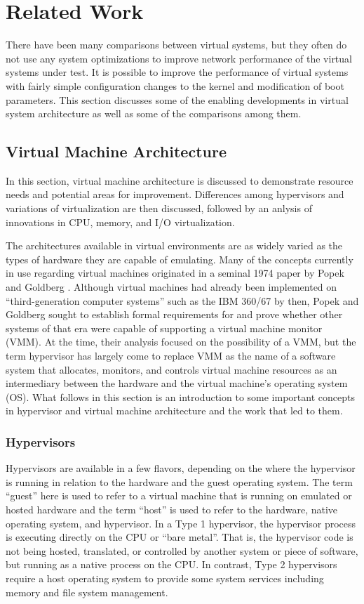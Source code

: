 \chapter{Related Work}
\label{sec:related_work}
There have been many comparisons between virtual systems, but they often do not use any system optimizations to improve network performance of the virtual systems under test.
It is possible to improve the performance of virtual systems with fairly simple configuration changes to the kernel and modification of boot parameters.
This section discusses some of the enabling developments in virtual system architecture as well as some of the comparisons among them.  

\section{Virtual Machine Architecture}
\label{sec:vmarchitecture}
In this section, virtual machine architecture is discussed to demonstrate resource needs and potential areas for improvement.
Differences among hypervisors and variations of virtualization are then discussed, followed by an anlysis of innovations in CPU, memory, and I/O virtualization.  

The architectures available in virtual environments are as widely varied as the types of hardware they are capable of emulating.
Many of the concepts currently in use regarding virtual machines originated in a seminal 1974 paper by Popek and Goldberg \autocite{_popek_1}.
Although virtual machines had already been implemented on ``third-generation computer systems'' such as the IBM 360/67 by then, Popek and Goldberg sought to establish formal requirements for and prove whether other systems of that era were capable of supporting a virtual machine monitor (VMM)\autocite{_popek_1}.
At the time, their analysis focused on the possibility of a VMM, but the term hypervisor has largely come to replace VMM as the name of a software system that allocates, monitors, and controls virtual machine resources as an intermediary between the hardware and the virtual machine's operating system (OS).
What follows in this section is an introduction to some important concepts in hypervisor and virtual machine architecture and the work that led to them.

\subsection{Hypervisors}
\label{sec:hypervisors}
Hypervisors are available in a few flavors, depending on the where the hypervisor is running in relation to the hardware and the guest operating system.
The term ``guest'' here is used to refer to a virtual machine that is running on emulated or hosted hardware and the term ``host'' is used to refer to the hardware, native operating system, and hypervisor.  
In a Type 1 hypervisor, the hypervisor process is executing directly on the CPU or ``bare metal''.
That is, the hypervisor code is not being hosted, translated, or controlled by another system or piece of software, but running as a native process on the CPU.
In contrast, Type 2 hypervisors require a host operating system to provide some system services including memory and file system management.

